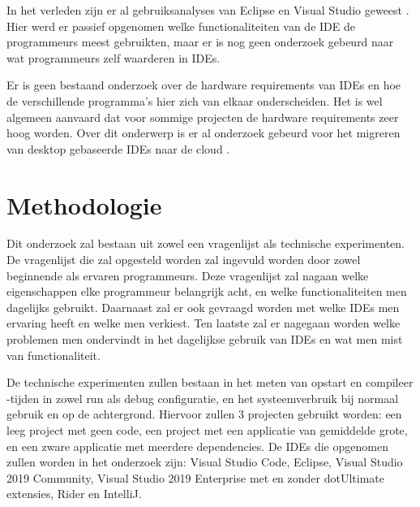 In het verleden zijn er al gebruiksanalyses van Eclipse en Visual Studio geweest \autocite{Murphy2006, Amann2016}. Hier werd er passief opgenomen welke functionaliteiten van de IDE de programmeurs meest gebruikten, maar er is nog geen onderzoek gebeurd naar wat programmeurs zelf waarderen in IDEs. 

Er is geen bestaand onderzoek over de hardware requirements van IDEs en hoe de verschillende programma’s hier zich van elkaar onderscheiden. Het is wel algemeen aanvaard dat voor sommige projecten de hardware requirements zeer hoog worden. Over dit onderwerp is er al onderzoek gebeurd voor het migreren van desktop gebaseerde IDEs naar de cloud \autocite{Devadiga2021}.


\section{Methodologie}
\label{sec:methodologie}

Dit onderzoek zal bestaan uit zowel een vragenlijst als technische experimenten. De vragenlijst die zal opgesteld worden zal ingevuld worden door zowel beginnende als ervaren programmeurs. Deze vragenlijst zal nagaan welke eigenschappen elke programmeur belangrijk acht, en welke functionaliteiten men dagelijks gebruikt. Daarnaast zal er ook gevraagd worden met welke IDEs men ervaring heeft en welke men verkiest. Ten laatste zal er nagegaan worden welke problemen men ondervindt in het dagelijkse gebruik van IDEs en wat men mist van functionaliteit.

De technische experimenten zullen bestaan in het meten van opstart en compileer -tijden in zowel run als debug configuratie, en het systeemverbruik bij normaal gebruik en op de achtergrond. Hiervoor zullen 3 projecten gebruikt worden: een leeg project met geen code, een project met een applicatie van gemiddelde grote, en een zware applicatie met meerdere dependencies. De IDEs die opgenomen zullen worden in het onderzoek zijn: Visual Studio Code, Eclipse, Visual Studio 2019 Community, Visual Studio 2019 Enterprise met en zonder dotUltimate extensies, Rider en IntelliJ.



